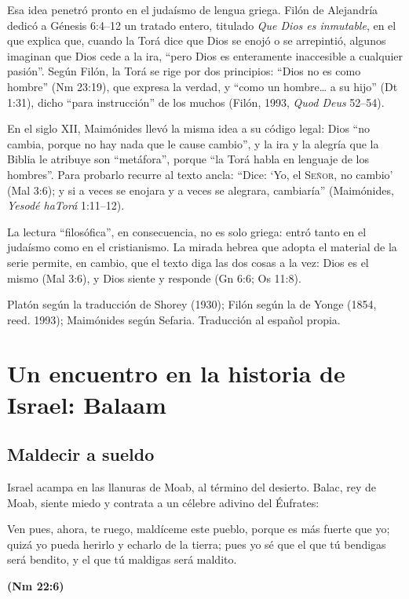 \documentclass[11pt,letterpaper]{article}
\newcommand{\SENOR}{\textsc{Señor}}
\newcommand{\fuente}[1]{\par\hfill{\upshape\bfseries\small\textcolor{azul}{#1}}}
\begin{document}
Esa idea penetró pronto en el judaísmo de lengua griega. Filón de Alejandría dedicó a Génesis 6:4--12 un tratado entero, titulado \emph{Que Dios es inmutable}, en el que explica que, cuando la Torá dice que Dios se enojó o se arrepintió, algunos imaginan que Dios cede a la ira, ``pero Dios es enteramente inaccesible a cualquier pasión''. Según Filón, la Torá se rige por dos principios: ``Dios no es como hombre'' (Nm 23:19), que expresa la verdad, y ``como un hombre\ldots{} a su hijo'' (Dt 1:31), dicho ``para instrucción'' de los muchos (Filón, 1993, \emph{Quod Deus} 52--54).

En el siglo XII, Maimónides llevó la misma idea a su código legal: Dios ``no cambia, porque no hay nada que le cause cambio'', y la ira y la alegría que la Biblia le atribuye son ``metáfora'', porque ``la Torá habla en lenguaje de los hombres''. Para probarlo recurre al texto ancla: ``Dice: `Yo, el \SENOR, no cambio' (Mal 3:6); y si a veces se enojara y a veces se alegrara, cambiaría'' (Maimónides, \emph{Yesodé haTorá} 1:11--12).

La lectura ``filosófica'', en consecuencia, no es solo griega: entró tanto en el judaísmo como en el cristianismo. La mirada hebrea que adopta el material de la serie permite, en cambio, que el texto diga las dos cosas a la vez: Dios es el mismo (Mal 3:6), y Dios siente y responde (Gn 6:6; Os 11:8).

\begin{nota}[Precisión]
Platón según la traducción de Shorey (1930); Filón según la de Yonge (1854, reed. 1993); Maimónides según Sefaria. Traducción al español propia.
\end{nota}

\section{Un encuentro en la historia de Israel: Balaam}

\subsection{Maldecir a sueldo}
Israel acampa en las llanuras de Moab, al término del desierto. Balac, rey de Moab, siente miedo y contrata a un célebre adivino del Éufrates:

\begin{cita}Ven pues, ahora, te ruego, maldíceme este pueblo, porque es más fuerte que yo; quizá yo pueda herirlo y echarlo de la tierra; pues yo sé que el que tú bendigas será bendito, y el que tú maldigas será maldito.\fuente{(Nm 22:6)}\end{cita}
\end{document}
